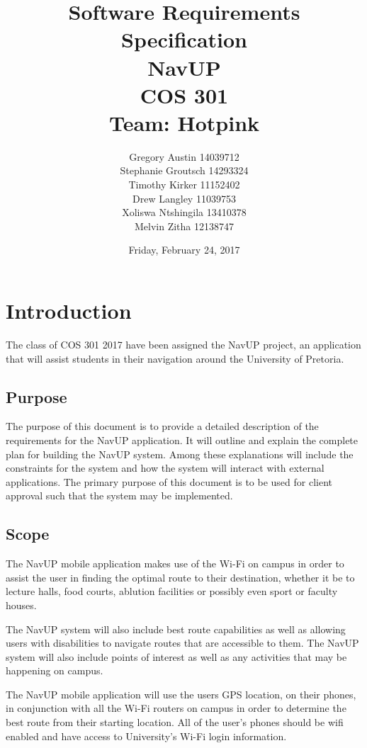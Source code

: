\documentclass[12pt,a4paper]{report}
\title{Software Requirements Specification \\ NavUP \\ COS 301 \\ Team: Hotpink}
\date{Friday, February 24, 2017}
\author{Gregory Austin 14039712 \\ Stephanie Groutsch 14293324 \\ Timothy Kirker 11152402 \\ Drew Langley 11039753 \\ Xoliswa Ntshingila 13410378 \\ Melvin Zitha 12138747}
\begin{document}
\maketitle



\newpage
 \section*{Introduction}
The class of COS 301 2017 have been assigned the NavUP project, an application that will assist students in their navigation around the University of Pretoria.

	\subsection*{Purpose}
	The purpose of this document is to provide a detailed description of the requirements for the NavUP application. It will outline and explain the complete plan for building the NavUP system. 
	Among these explanations will include the constraints for the system and how the system will interact with external applications. The primary purpose of this document is to be used for client approval such that the system may be implemented.

		
	\subsection*{Scope}
	The NavUP mobile application makes use of the Wi-Fi on campus in order to assist the user in finding the optimal route to their destination, whether it be to lecture halls, food courts, ablution facilities or possibly even sport or faculty houses.

	The NavUP system will also include best route capabilities as well as allowing users with disabilities to navigate routes that are accessible to them. The NavUP system will also include points of interest as well as any activities that may be happening on campus.
	
	The NavUP mobile application will use the users GPS location, on their phones, in conjunction with all the Wi-Fi routers on campus in order to determine the best route from their starting location. All of the user’s phones should be wifi enabled and have access to University’s Wi-Fi login information.	
\end{document}
